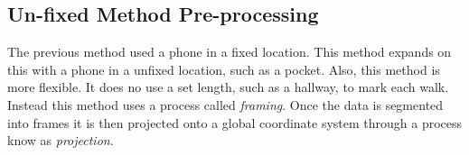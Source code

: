 \documentclass{sig-alternate}
\begin{document}
\subsection{Un-fixed Method Pre-processing}{
	The previous method used a phone in a fixed location. This method expands on this with a phone in a unfixed location, such as a pocket. Also, this method is more flexible. It does no use a set length, such as a hallway, to mark each walk. Instead this method uses a process called \textit{framing}. Once the data is segmented into frames it is then projected onto a global coordinate system through a process know as \textit{projection}.}
		
\end{document}
